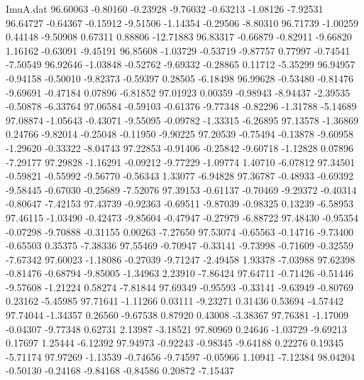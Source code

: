 \begin{filecontents}{ImuA.dat}
  96.60063   -0.80160   -0.23928   -9.76032   -0.63213   -1.08126   -7.92531
  96.64727   -0.64367   -0.15912   -9.51506   -1.14354   -0.29506   -8.80310
  96.71739   -1.00259    0.44148   -9.50908    0.67311    0.88806  -12.71883
  96.83317   -0.66879   -0.82911   -9.66820    1.16162   -0.63091   -9.45191
  96.85608   -1.03729   -0.53719   -9.87757    0.77997   -0.74541   -7.50549
  96.92646   -1.03848   -0.52762   -9.69332   -0.28865    0.11712   -5.35299
  96.94957   -0.94158   -0.50010   -9.82373   -0.59397    0.28505   -6.18498
  96.99628   -0.53480   -0.81476   -9.69691   -0.47184    0.07896   -6.81852
  97.01923    0.00359   -0.98943   -8.94437   -2.39535   -0.50878   -6.33764
  97.06584   -0.59103   -0.61376   -9.77348   -0.82296   -1.31788   -5.14689
  97.08874   -1.05643   -0.43071   -9.55095   -0.09782   -1.33315   -6.26895
  97.13578   -1.36869    0.24766   -9.82014   -0.25048   -0.11950   -9.90225
  97.20539   -0.75494   -0.13878   -9.60958   -1.29620   -0.33322   -8.04743
  97.22853   -0.91406   -0.25842   -9.60718   -1.12828    0.07896   -7.29177
  97.29828   -1.16291   -0.09212   -9.77229   -1.09774    1.40710   -6.07812
  97.34501   -0.59821   -0.55992   -9.56770   -0.56343    1.33077   -6.94828
  97.36787   -0.48933   -0.69392   -9.58445   -0.67030   -0.25689   -7.52076
  97.39153   -0.61137   -0.70469   -9.29372   -0.40314   -0.80647   -7.42153
  97.43739   -0.92363   -0.69511   -9.87039   -0.98325    0.13239   -6.58953
  97.46115   -1.03490   -0.42473   -9.85604   -0.47947   -0.27979   -6.88722
  97.48430   -0.95354   -0.07298   -9.70888   -0.31155    0.00263   -7.27650
  97.53074   -0.65563   -0.14716   -9.73400   -0.65503    0.35375   -7.38336
  97.55469   -0.70947   -0.33141   -9.73998   -0.71609   -0.32559   -7.67342
  97.60023   -1.18086   -0.27039   -9.71247   -2.49458    1.93378   -7.03988
  97.62398   -0.81476   -0.68794   -9.85005   -1.34963    2.23910   -7.86424
  97.64711   -0.71426   -0.51446   -9.57608   -1.21224    0.58274   -7.81844
  97.69349   -0.95593   -0.33141   -9.63949   -0.80769    0.23162   -5.45985
  97.71641   -1.11266    0.03111   -9.23271    0.31436    0.53694   -4.57442
  97.74044   -1.34357    0.26560   -9.67538    0.87920    0.43008   -3.38367
  97.76381   -1.17009   -0.04307   -9.77348    0.62731    2.13987   -3.18521
  97.80969    0.24646   -1.03729   -9.69213    0.17697    1.25444   -6.12392
  97.94973   -0.92243   -0.98345   -9.64188    0.22276    0.19345   -5.71174
  97.97269   -1.13539   -0.74656   -9.74597   -0.05966    1.10941   -7.12384
  98.04204   -0.50130   -0.24168   -9.84168   -0.84586    0.20872   -7.15437

\end{filecontents}
